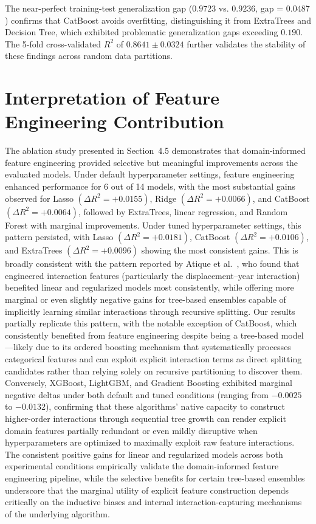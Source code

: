 The near-perfect training-test generalization gap ($0.9723$ vs. $0.9236$, gap = $0.0487$) confirms that CatBoost avoids overfitting, distinguishing it from ExtraTrees and Decision Tree, which exhibited problematic generalization gaps exceeding $0.190$. The 5-fold cross-validated $R^2$ of $0.8641 \pm 0.0324$ further validates the stability of these findings across random data partitions.


\section{Interpretation of Feature Engineering Contribution}

The ablation study presented in Section~4.5 demonstrates that domain-informed feature engineering provided selective but meaningful improvements across the evaluated models. Under default hyperparameter settings, feature engineering enhanced performance for 6 out of 14 models, with the most substantial gains observed for Lasso \((\Delta R^2 = +0.0155)\), Ridge \((\Delta R^2 = +0.0066)\), and CatBoost \((\Delta R^2 = +0.0064)\), followed by ExtraTrees, linear regression, and Random Forest with marginal improvements. Under tuned hyperparameter settings, this pattern persisted, with Lasso \((\Delta R^2 = +0.0181)\), CatBoost \((\Delta R^2 = +0.0106)\), and ExtraTrees \((\Delta R^2 = +0.0096)\) showing the most consistent gains. This is broadly consistent with the pattern reported by Atique et al.~\cite{atique2026explainable}, who found that engineered interaction features (particularly the displacement--year interaction) benefited linear and regularized models most consistently, while offering more marginal or even slightly negative gains for tree-based ensembles capable of implicitly learning similar interactions through recursive splitting. Our results partially replicate this pattern, with the notable exception of CatBoost, which consistently benefited from feature engineering despite being a tree-based model---likely due to its ordered boosting mechanism that systematically processes categorical features and can exploit explicit interaction terms as direct splitting candidates rather than relying solely on recursive partitioning to discover them. Conversely, XGBoost, LightGBM, and Gradient Boosting exhibited marginal negative deltas under both default and tuned conditions (ranging from \(-0.0025\) to \(-0.0132\)), confirming that these algorithms' native capacity to construct higher-order interactions through sequential tree growth can render explicit domain features partially redundant or even mildly disruptive when hyperparameters are optimized to maximally exploit raw feature interactions. The consistent positive gains for linear and regularized models across both experimental conditions empirically validate the domain-informed feature engineering pipeline, while the selective benefits for certain tree-based ensembles underscore that the marginal utility of explicit feature construction depends critically on the inductive biases and internal interaction-capturing mechanisms of the underlying algorithm.


